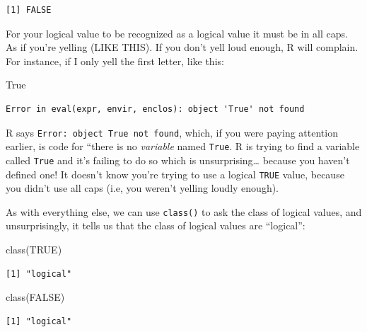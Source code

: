 \documentclass[
  letterpaper,
  DIV=11,
  numbers=noendperiod]{scrreprt}
\newenvironment{Shaded}{\begin{snugshade}}{\end{snugshade}}
\newcommand{\ConstantTok}[1]{\textcolor[rgb]{0.56,0.35,0.01}{#1}}
\newcommand{\FunctionTok}[1]{\textcolor[rgb]{0.28,0.35,0.67}{#1}}
\newcommand{\NormalTok}[1]{\textcolor[rgb]{0.00,0.23,0.31}{#1}}
\begin{document}
\begin{verbatim}
[1] FALSE
\end{verbatim}

For your logical value to be recognized as a logical value it must be in
all caps. As if you're yelling (LIKE THIS). If you don't yell loud
enough, R will complain. For instance, if I only yell the first letter,
like this:

\begin{Shaded}
\begin{Highlighting}[]
\NormalTok{True}
\end{Highlighting}
\end{Shaded}

\begin{verbatim}
Error in eval(expr, envir, enclos): object 'True' not found
\end{verbatim}

R says
\texttt{Error:\ object\ \textquotesingle{}True\textquotesingle{}\ not\ found},
which, if you were paying attention earlier, is code for ``there is no
\emph{variable} named \texttt{True}. R is trying to find a variable
called \texttt{True} and it's failing to do so which is
unsurprising\ldots{} because you haven't defined one! It doesn't know
you're trying to use a logical \texttt{TRUE} value, because you didn't
use all caps (i.e, you weren't yelling loudly enough).

As with everything else, we can use \texttt{class()} to ask the class of
logical values, and unsurprisingly, it tells us that the class of
logical values are ``logical'':

\begin{Shaded}
\begin{Highlighting}[]
\FunctionTok{class}\NormalTok{(}\ConstantTok{TRUE}\NormalTok{)}
\end{Highlighting}
\end{Shaded}

\begin{verbatim}
[1] "logical"
\end{verbatim}

\begin{Shaded}
\begin{Highlighting}[]
\FunctionTok{class}\NormalTok{(}\ConstantTok{FALSE}\NormalTok{)}
\end{Highlighting}
\end{Shaded}

\begin{verbatim}
[1] "logical"
\end{verbatim}
\end{document}
